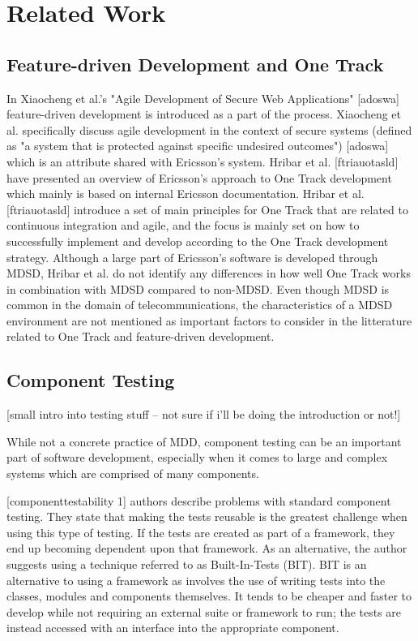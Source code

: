 \documentclass[fina_report_innit.tex]{subfiles}
\begin{document}
\section{Related Work}

\blindtext

\subsection{Feature-driven Development and One Track}
In Xiaocheng et al.'s "Agile Development of Secure Web Applications" [adoswa] feature-driven development is introduced as a part of the process. Xiaocheng et al. specifically discuss agile development in the context of secure systems (defined as "a system that is protected against specific undesired outcomes") [adoswa] which is an attribute shared with Ericsson's system. Hribar et al. [ftriauotasld] have presented an overview of Ericsson's approach to One Track development which mainly is based on internal Ericsson documentation. Hribar et al. [ftriauotasld] introduce a set of main principles for One Track that are related to continuous integration and agile, and the focus is mainly set on how to successfully implement and develop according to the One Track development strategy. Although a large part of Ericsson's software is developed through MDSD, Hribar et al. do not identify any differences in how well One Track works in combination with MDSD compared to non-MDSD. Even though MDSD is common in the domain of telecommunications, the characteristics of a MDSD environment are not mentioned as important factors to consider in the litterature related to One Track and feature-driven development. 


\subsection*{Component Testing}
[small intro into testing stuff – not sure if i'll be doing the introduction or not!]

While not a concrete practice of MDD, component testing can be an important part of software development, especially when it comes to large and complex systems which are comprised of many components.

[componenttestability 1] authors describe problems with standard component testing. They state that making the tests reusable is the greatest challenge when using this type of testing. If the tests are created as part of a framework, they end up becoming dependent upon that framework. As an alternative, the author suggests using a technique referred to as Built-In-Tests (BIT). BIT is an alternative to using a framework as involves the use of writing tests into the classes, modules and components themselves. It tends to be cheaper and faster to develop while not requiring an external suite or framework to run; the tests are instead accessed with an interface into the appropriate component.
\end{document}
